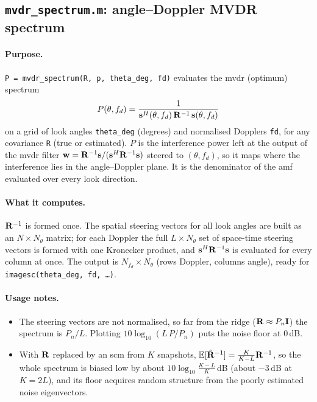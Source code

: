 \documentclass{article}
\begin{document}
\subsection{\texttt{mvdr\_spectrum.m}: angle--Doppler MVDR spectrum}\label{sec:code:mvdr}

\paragraph{Purpose.} \texttt{P = mvdr\_spectrum(R, p, theta\_deg, fd)} evaluates the \gls{mvdr} (optimum) spectrum
\[
  P(\theta,f_d) = \frac{1}{\vb s^H(\theta,f_d)\,\mathbf{R}^{-1}\,\vb s(\theta,f_d)}
\]
on a grid of look angles \texttt{theta\_deg} (degrees) and normalised Dopplers \texttt{fd}, for any covariance \texttt{R} (true or estimated). $P$ is the interference power left at the output of the \gls{mvdr} filter $\vb w=\mathbf{R}^{-1}\vb s/(\vb s^H\mathbf{R}^{-1}\vb s)$ steered to $(\theta,f_d)$, so it maps where the interference lies in the angle--Doppler plane. It is the denominator of the \gls{amf} evaluated over every look direction.

\paragraph{What it computes.} $\mathbf{R}^{-1}$ is formed once. The spatial steering vectors for all look angles are built as an $N\times N_\theta$ matrix; for each Doppler the full $L\times N_\theta$ set of space-time steering vectors is formed with one Kronecker product, and $\vb s^H\mathbf{R}^{-1}\vb s$ is evaluated for every column at once. The output is $N_{f_d}\times N_\theta$ (rows Doppler, columns angle), ready for \texttt{imagesc(theta\_deg, fd, \ldots)}.

\paragraph{Usage notes.}
\begin{itemize}
  \item The steering vectors are not normalised, so far from the ridge ($\mathbf{R}\approx P_n\mathbf{I}$) the spectrum is $P_n/L$. Plotting $10\log_{10}(L\,P/P_n)$ puts the noise floor at $0$\,dB.
  \item With $\mathbf{R}$ replaced by an \gls{scm} from $K$ snapshots, $\mathbb{E}[\hat{\mathbf{R}}^{-1}]=\frac{K}{K-L}\mathbf{R}^{-1}$, so the whole spectrum is biased low by about $10\log_{10}\frac{K-L}{K}$\,dB (about $-3$\,dB at $K=2L$), and its floor acquires random structure from the poorly estimated noise eigenvectors.
\end{itemize}
\end{document}
